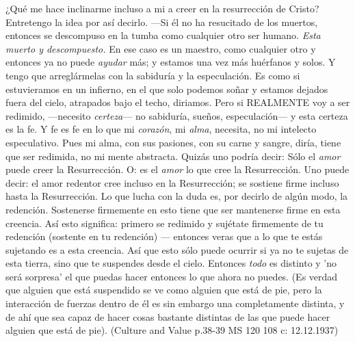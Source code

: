 \begin{revision}
¿Qué me hace inclinarme incluso a mi a creer en la resurrección de Cristo?
Entretengo la idea por así decirlo. ---Si él no ha resucitado de los muertos,
entonces se descompuso en la tumba como cualquier otro ser humano. \emph{Esta
muerto y descompuesto.} En ese caso es un maestro, como cualquier otro y
entonces ya no puede \emph{ayudar} más; y estamos una vez más huérfanos y solos.
Y tengo que arreglármelas con la sabiduría y la especulación. Es como si
estuvieramos en un infierno, en el que solo podemos soñar y estamos dejados
fuera del cielo, atrapados bajo el techo, diriamos. Pero si REALMENTE voy a ser
redimido, ---necesito \emph{certeza}--- no sabiduría, sueños, especulación--- y
esta certeza es la fe. Y fe es fe en lo que mi \emph{corazón}, mi \emph{alma},
necesita, no mi intelecto especulativo. Pues mi alma, con sus pasiones, con su
carne y sangre, diría, tiene que ser redimida, no mi mente abstracta. Quizás uno
podría decir: Sólo el \emph{amor} puede creer la Resurrección. O: es el
\emph{amor} lo que cree la Resurrección. Uno puede decir: el amor redentor cree
incluso en la Resurrección; se sostiene firme incluso hasta la Resurrección. Lo
que lucha con la duda es, por decirlo de algún modo, la redención. Sostenerse
firmemente en esto tiene que ser mantenerse firme en esta creencia. Así esto
significa: primero se redimido y sujétate firmemente de tu redención (sostente en tu
redención) --- entonces veras que a lo que te estás sujetando es a esta
creencia. Así que esto sólo puede ocurrir si ya no te sujetas de esta tierra,
sino que te suspendes desde el cielo. Entonces \emph{todo} es distinto y 'no
será sorpresa' el que puedas hacer entonces lo que ahora no puedes. (Es verdad
que alguien que está suspendido se ve como alguien que está de pie, pero la
interacción de fuerzas dentro de él es sin embargo una completamente distinta, y
de ahí que sea capaz de hacer cosas bastante distintas de las que puede hacer
alguien que está de pie). (Culture and Value p.38-39 MS 120 108 c: 12.12.1937)
\end{revision}
